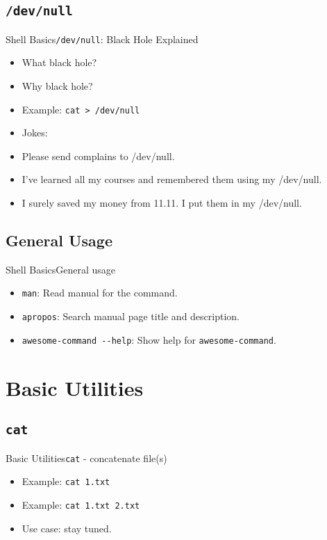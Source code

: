 \documentclass[aspectratio=169]{beamer}
\begin{document}
\subsection{\tt /dev/null}
\begin{frame}{Shell Basics}{\texttt{/dev/null}: Black Hole Explained}

\begin{itemize}[<+->]
\item
  What black hole?
\item
  Why black hole?
\item
  Example: \texttt{cat\ \textgreater{}\ /dev/null}
\item
  Jokes:
\item
  Please send complains to /dev/null.
\item
  I've learned all my courses and remembered them using my /dev/null.
\item
  I surely saved my money from 11.11. I put them in my /dev/null.
\end{itemize}

\end{frame}

\subsection{General Usage}
\begin{frame}{Shell Basics}{General usage}

\begin{itemize}[<+->]
\item
  \texttt{man}: Read manual for the command.
\item
  \texttt{apropos}: Search manual page title and description.
\item
  \texttt{awesome-command\ -\/-help}: Show help for
  \texttt{awesome-command}.
\end{itemize}

\end{frame}

\section{Basic Utilities}\label{basic-utilities}

\subsection{\tt cat}
\begin{frame}{Basic Utilities}{\texttt{cat} - concatenate file(s)}

\begin{itemize}[<+->]
\item
  Example: \texttt{cat\ 1.txt}
\item
  Example: \texttt{cat\ 1.txt\ 2.txt}
\item
  Use case: stay tuned.
\end{itemize}

\end{frame}
\end{document}
